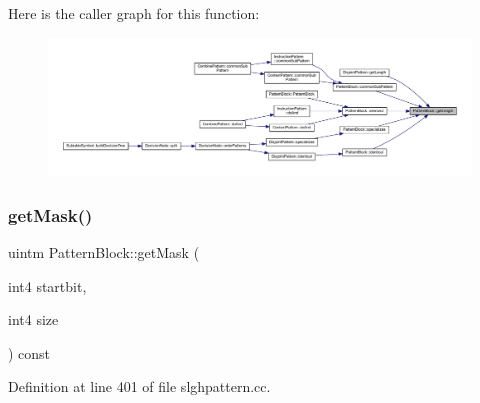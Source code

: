 Here is the caller graph for this function\+:
\nopagebreak
\begin{figure}[H]
\begin{center}
\leavevmode
\includegraphics[width=350pt]{class_pattern_block_acf2619fb7613d032fc3ff61a9e84c0d5_icgraph}
\end{center}
\end{figure}
\mbox{\label{class_pattern_block_a8e4dd2db9cdde4ebb3d602cdeefefd79}} 
\subsubsection{\texorpdfstring{getMask()}{getMask()}}
{\footnotesize\ttfamily uintm Pattern\+Block\+::get\+Mask (\begin{DoxyParamCaption}\item[{int4}]{startbit,  }\item[{int4}]{size }\end{DoxyParamCaption}) const}



Definition at line 401 of file slghpattern.\+cc.

